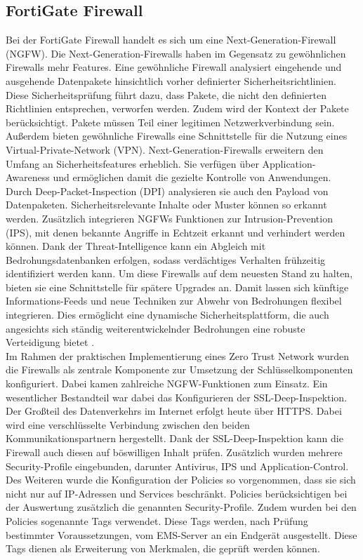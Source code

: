 \documentclass[lettersize,journal]{IEEEtran}
\begin{document}
\subsection{FortiGate Firewall}
Bei der FortiGate Firewall handelt es sich um eine Next-Generation-Firewall (NGFW). Die Next-Generation-Firewalls haben im Gegensatz zu gewöhnlichen Firewalls mehr Features. Eine gewöhnliche Firewall analysiert eingehende und ausgehende Datenpakete hinsichtlich vorher definierter Sicherheitsrichtlinien. Diese Sicherheitsprüfung führt dazu, dass Pakete, die nicht den definierten Richtlinien entsprechen, verworfen werden. Zudem wird der Kontext der Pakete berücksichtigt. Pakete müssen Teil einer legitimen Netzwerkverbindung sein. Außerdem bieten gewöhnliche Firewalls eine Schnittstelle für die Nutzung eines Virtual-Private-Network (VPN). Next-Generation-Firewalls erweitern den Umfang an Sicherheitsfeatures erheblich. Sie verfügen über Application-Awareness und ermöglichen damit die gezielte Kontrolle von Anwendungen. Durch Deep-Packet-Inspection (DPI) analysieren sie auch den Payload von Datenpaketen. Sicherheitsrelevante Inhalte oder Muster können so erkannt werden. Zusätzlich integrieren NGFWs Funktionen zur Intrusion-Prevention (IPS), mit denen bekannte Angriffe in Echtzeit erkannt und verhindert werden können. Dank der Threat-Intelligence kann ein Abgleich mit Bedrohungsdatenbanken erfolgen, sodass verdächtiges Verhalten frühzeitig identifiziert werden kann. Um diese Firewalls auf dem neuesten Stand zu halten, bieten sie eine Schnittstelle für spätere Upgrades an. Damit lassen sich künftige Informations-Feeds und neue Techniken zur Abwehr von Bedrohungen flexibel integrieren. Dies ermöglicht eine dynamische Sicherheitsplattform, die auch angesichts sich ständig weiterentwickelnder Bedrohungen eine robuste Verteidigung bietet \cite{cloudflare_ngfw}.\\
Im Rahmen der praktischen Implementierung eines Zero Trust Network wurden die Firewalls als zentrale Komponente zur Umsetzung der Schlüsselkomponenten konfiguriert. Dabei kamen zahlreiche NGFW-Funktionen zum Einsatz. Ein wesentlicher Bestandteil war dabei das Konfigurieren der SSL-Deep-Inspektion. Der Großteil des Datenverkehrs im Internet erfolgt heute über HTTPS. Dabei wird eine verschlüsselte Verbindung zwischen den beiden Kommunikationspartnern hergestellt. Dank der SSL-Deep-Inspektion kann die Firewall auch diesen auf böswilligen Inhalt prüfen. Zusätzlich wurden mehrere Security-Profile eingebunden, darunter Antivirus, IPS und Application-Control. Des Weiteren wurde die Konfiguration der Policies so vorgenommen, dass sie sich nicht nur auf IP-Adressen und Services beschränkt. Policies berücksichtigen bei der Auswertung zusätzlich die genannten Security-Profile. Zudem wurden bei den Policies sogenannte Tags verwendet. Diese Tags werden, nach Prüfung bestimmter Voraussetzungen, vom EMS-Server an ein Endgerät ausgestellt. Diese Tags dienen als Erweiterung von Merkmalen, die geprüft werden können.
\end{document}
